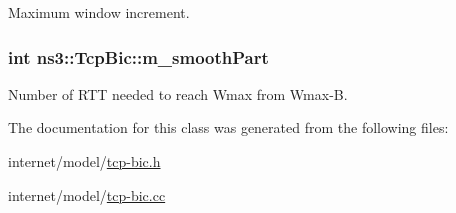 Maximum window increment. 

\subsubsection[{\texorpdfstring{m\+\_\+smooth\+Part}{m_smoothPart}}]{\setlength{\rightskip}{0pt plus 5cm}int ns3\+::\+Tcp\+Bic\+::m\+\_\+smooth\+Part\hspace{0.3cm}{\ttfamily [private]}}\hypertarget{classns3_1_1TcpBic_a69437c77ce1d0e51238f51c262d58bf1}{}\label{classns3_1_1TcpBic_a69437c77ce1d0e51238f51c262d58bf1}


Number of R\+TT needed to reach Wmax from Wmax-\/B. 



The documentation for this class was generated from the following files\+:\begin{DoxyCompactItemize}
\item 
internet/model/\hyperlink{tcp-bic_8h}{tcp-\/bic.\+h}\item 
internet/model/\hyperlink{tcp-bic_8cc}{tcp-\/bic.\+cc}\end{DoxyCompactItemize}
